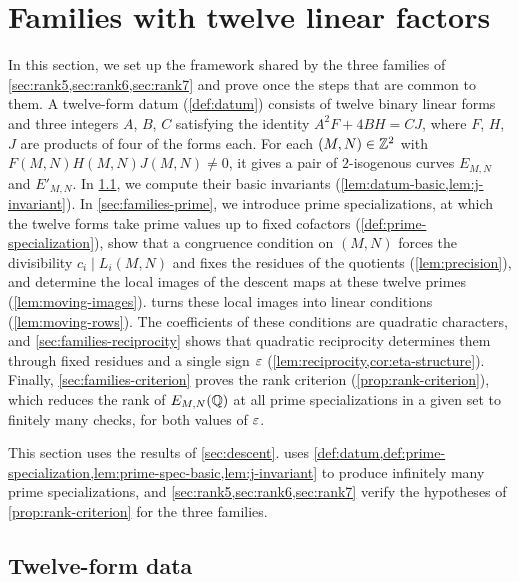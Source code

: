 \chapter{Families with twelve linear factors}\label{sec:families}

In this section, we set up the framework shared by the three families of \cref{sec:rank5,sec:rank6,sec:rank7} and prove once the steps that are common to them. A twelve-form datum (\cref{def:datum}) consists of twelve binary linear forms and three integers $A$, $B$, $C$ satisfying the identity $A^2F+4BH=CJ$, where $F$, $H$, $J$ are products of four of the forms each. For each $(M,N)\in\mathbb Z^2$ with $F(M,N)H(M,N)J(M,N)\ne0$, it gives a pair of $2$-isogenous curves $E_{M,N}$ and $E'_{M,N}$. In \cref{sec:families-data}, we compute their basic invariants (\cref{lem:datum-basic,lem:j-invariant}). In \cref{sec:families-prime}, we introduce prime specializations, at which the twelve forms take prime values up to fixed cofactors (\cref{def:prime-specialization}), show that a congruence condition on $(M,N)$ forces the divisibility $c_i\mid L_i(M,N)$ and fixes the residues of the quotients (\cref{lem:precision}), and determine the local images of the descent maps at these twelve primes (\cref{lem:moving-images}).  turns these local images into linear conditions (\cref{lem:moving-rows}). The coefficients of these conditions are quadratic characters, and \cref{sec:families-reciprocity} shows that quadratic reciprocity determines them through fixed residues and a single sign $\varepsilon$ (\cref{lem:reciprocity,cor:eta-structure}). Finally, \cref{sec:families-criterion} proves the rank criterion (\cref{prop:rank-criterion}), which reduces the rank of $E_{M,N}(\mathbb Q)$ at all prime specializations in a given set to finitely many checks, for both values of $\varepsilon$.

This section uses the results of \cref{sec:descent}.  uses \cref{def:datum,def:prime-specialization,lem:prime-spec-basic,lem:j-invariant} to produce infinitely many prime specializations, and \cref{sec:rank5,sec:rank6,sec:rank7} verify the hypotheses of \cref{prop:rank-criterion} for the three families.

\section{Twelve-form data}\label{sec:families-data}

